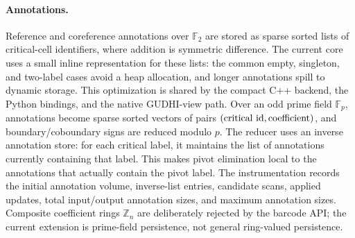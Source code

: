 \documentclass[11pt]{article}
\newcommand{\Ftwo}{\mathbb{F}_2}
\newcommand{\Fp}{\mathbb{F}_p}
\begin{document}
\paragraph{Annotations.}
Reference and coreference annotations over $\Ftwo$ are stored as sparse sorted lists of
critical-cell identifiers, where addition is symmetric difference.  The current core uses a
small inline representation for these lists: the common empty, singleton, and two-label
cases avoid a heap allocation, and longer annotations spill to dynamic storage.  This
optimization is shared by the compact C++ backend, the Python bindings, and the native
GUDHI-view path.  Over an odd prime field $\Fp$, annotations become sparse sorted vectors of pairs
$(\hbox{critical id},\hbox{coefficient})$, and boundary/coboundary signs are reduced
modulo $p$.  The reducer uses an inverse annotation store: for each critical label, it
maintains the list of annotations currently containing that label.  This makes pivot
elimination local to the annotations that actually contain the pivot label.  The
instrumentation records the initial annotation volume, inverse-list entries, candidate
scans, applied updates, total input/output annotation sizes, and maximum annotation sizes.
Composite coefficient rings $\mathbb{Z}_n$ are deliberately rejected by the barcode API;
the current extension is prime-field persistence, not general ring-valued persistence.
\end{document}
